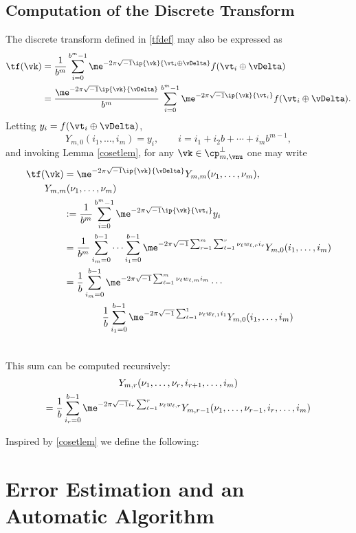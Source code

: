\documentclass[]{elsarticle}
\theoremstyle{definition}
\begin{document}
\subsection{Computation of the Discrete Transform}
The discrete transform defined in \eqref{tfdef} may also be expressed as
\begin{align}
\nonumber
\tf(\vk) 
&= \frac{1}{b^m} \sum_{i=0}^{b^m-1} \me^{-2 \pi \sqrt{-1} \ip{\vk}{\vt_i\oplus \vDelta}} f(\vt_i\oplus \vDelta) \\
\nonumber
&= \frac{\me^{-2 \pi \sqrt{-1} \ip{\vk}{\vDelta}}}{b^m} \sum_{i=0}^{b^m-1} \me^{-2 \pi \sqrt{-1} \ip{\vk}{\vt_i}} f(\vt_i\oplus \vDelta).
\end{align}
Letting $y_i=f(\vt_i\oplus \vDelta)$, 
\[
Y_{m,0}(i_1,\ldots, i_m) = y_i, \qquad i=i_1 + i_2 b + \cdots + i_m b^{m-1},
\]
and invoking Lemma \ref{cosetlem}, for any $\vk \in \cp_{m,\vnu}^{\perp}$ one may write
\begin{align}
\nonumber
\tf(\vk) &= \me^{-2 \pi \sqrt{-1} \ip{\vk}{\vDelta}}  Y_{m,m}(\nu_1, \ldots, \nu_m) , \\
\nonumber
\MoveEqLeft{Y_{m,m}(\nu_1, \ldots, \nu_m)}\\ 
\nonumber
& : = \frac{1}{b^m} \sum_{i=0}^{b^m-1} \me^{-2 \pi \sqrt{-1} \ip{\vk}{\vt_i}} y_i \\
\nonumber
& = \frac{1}{b^m} \sum_{i_m=0}^{b-1} \cdots \sum_{i_1=0}^{b-1} \me^{-2 \pi \sqrt{-1} \sum_{r=1}^{m} \sum_{\ell=1}^{r} \nu_\ell w_{\ell,r} i_r} Y_{m,0}(i_1,\ldots, i_m) \\
\nonumber
& = \frac{1}{b} \sum_{i_m=0}^{b-1}\me^{-2 \pi \sqrt{-1} \sum_{\ell=1}^{m} \nu_\ell w_{\ell,m} i_m}  \cdots \\
&\qquad \qquad \frac{1}{b} \sum_{i_1=0}^{b-1} \me^{-2 \pi \sqrt{-1} \sum_{\ell=1}^{1} \nu_\ell w_{\ell,1} i_1} Y_{m,0}(i_1,\ldots, i_m) \\
\nonumber
\end{align}

This sum can be computed recursively:
\begin{multline*}
Y_{m,r}(\nu_1, \ldots, \nu_r,i_{r+1}, \ldots, i_m) \\
= \frac{1}{b} \sum_{i_r=0}^{b-1} \me^{-2 \pi \sqrt{-1} i_r \sum_{\ell=1}^{r} \nu_\ell w_{\ell,r} } Y_{m,r-1}(\nu_1, \ldots, \nu_{r-1},i_{r}, \ldots, i_m)
\end{multline*}



Inspired by \eqref{cosetlem} we define the following:

\section{Error Estimation and an Automatic Algorithm}
\end{document}
